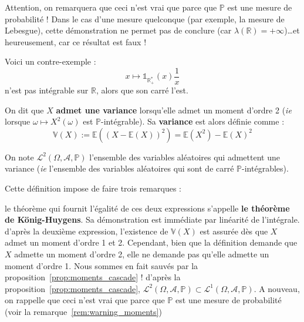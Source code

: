 \documentclass[../integ-proba.tex]{subfiles}
\begin{document}
    \begin{rem}
        \label{rem:warning_moments}
        Attention, on remarquera que ceci n'est vrai que parce que $\mathbb{P}$ est une mesure de probabilité !
        Dans le cas d'une mesure quelconque (par exemple, la mesure de Lebesgue), cette démonstration ne permet pas de conclure (car $\lambda(\mathbb{R}) = +\infty$)\ldots et heureusement, car ce résultat est faux !

        Voici un contre-exemple :
        \begin{displaymath}
          x \mapsto \mathds{1}_{\mathbb{R}_+^*}(x)\frac{1}{x}
        \end{displaymath}
        n'est pas intégrable sur $\mathbb{R}$, alors que son carré l'est.
    \end{rem}

    \begin{defi}
        On dit que $X$ \textbf{admet une variance} lorsqu'elle admet un moment d'ordre 2 (\textit{ie} lorsque $\omega \mapsto X^2\left(\omega\right)$ est $\mathbb{P}$-intégrable).
        Sa \textbf{variance} est alors définie comme :
        \begin{displaymath}
            \mathbb{V}(X):=\mathbb{E}\left(\left(X - \mathbb{E}\left(X\right)\right)^2\right)=\mathbb{E}\left(X^2\right) - \mathbb{E}\left(X\right)^2
        \end{displaymath}

        On note $\mathcal{L}^2\left(\Omega, \mathcal{A}, \mathbb{P}\right)$ l'ensemble des variables aléatoires qui admettent une variance (\textit{ie} l'ensemble des variables aléatoires qui sont de carré $\mathbb{P}$-intégrables).
    \end{defi}

    \begin{rem}
        Cette définition impose de faire trois remarques :
        \begin{itemize}
            \itemb le théorème qui fournit l'égalité de ces deux expressions s'appelle \textbf{le théorème de König-Huygens}.
            Sa démonstration est immédiate par linéarité de l'intégrale.
            \itemb d'après la deuxième expression, l'existence de $\mathbb{V}(X)$ est assurée dès que $X$ admet un moment d'ordre 1 et 2.
            Cependant, bien que la définition demande que $X$ admette un moment d'ordre 2, elle ne demande pas qu'elle admette un moment d'ordre 1.
            Nous sommes en fait sauvés par la proposition~\ref{prop:moments_cascade} !
            \itemb d'après la proposition~\ref{prop:moments_cascade}, $\mathcal{L}^2\left(\Omega, \mathcal{A}, \mathbb{P}\right) \subset \mathcal{L}^1\left(\Omega, \mathcal{A}, \mathbb{P}\right)$.
            A nouveau, on rappelle que ceci n'est vrai que parce que $\mathbb{P}$ est une mesure de probabilité (voir la remarque~\ref{rem:warning_moments})
        \end{itemize}
    \end{rem}
\end{document}

